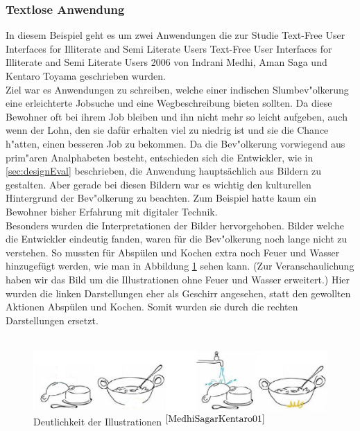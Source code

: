 \newpage
\subsubsection{Textlose Anwendung}\label{sec:beisp3}
In diesem Beispiel geht es um zwei Anwendungen die zur Studie \glqq Text-Free User Interfaces for Illiterate and Semi Literate Users\grqq{}
					{Text-Free User Interfaces for Illiterate and Semi Literate Users}
					{2006}
					{}
 von Indrani Medhi, Aman Saga und Kentaro Toyama geschrieben wurden.\\
Ziel war es Anwendungen zu schreiben, welche einer indischen Slumbev"olkerung eine erleichterte Jobsuche und eine Wegbeschreibung bieten sollten. Da diese Bewohner oft bei ihrem Job bleiben und ihn nicht mehr so leicht aufgeben, auch wenn der Lohn, den sie dafür erhalten viel zu niedrig ist und sie die Chance h"atten, einen besseren Job zu bekommen. Da die Bev"olkerung vorwiegend aus prim"aren Analphabeten besteht, entschieden sich die Entwickler, wie in  \ref{sec:designEval} beschrieben,  die Anwendung hauptsächlich aus Bildern zu gestalten. Aber gerade bei diesen Bildern war es wichtig den kulturellen Hintergrund der Bev"olkerung zu beachten. Zum Beispiel hatte kaum ein Bewohner bisher Erfahrung mit digitaler Technik.\\
Besonders wurden die Interpretationen der Bilder hervorgehoben. Bilder welche die Entwickler eindeutig fanden, waren für die Bev"olkerung noch lange nicht zu verstehen. So mussten für Abspülen und Kochen extra noch Feuer und Wasser hinzugefügt werden, wie man in Abbildung \ref{fig:picfail} sehen kann. (Zur Veranschaulichung haben wir das Bild um die Illustrationen ohne Feuer und Wasser erweitert.) Hier wurden die linken Darstellungen eher als Geschirr angesehen, statt den gewollten Aktionen Abspülen und Kochen. Somit wurden sie durch die rechten Darstellungen ersetzt.\\\\

\begin{figure}[h]
	\centering
		\includegraphics[width=1.00\textwidth]{Daten/pic_fail2.PNG}
	\caption{Deutlichkeit der Illustrationen $^{\ref{MedhiSagarKentaro01}}$}
	\label{fig:picfail}
\end{figure}

